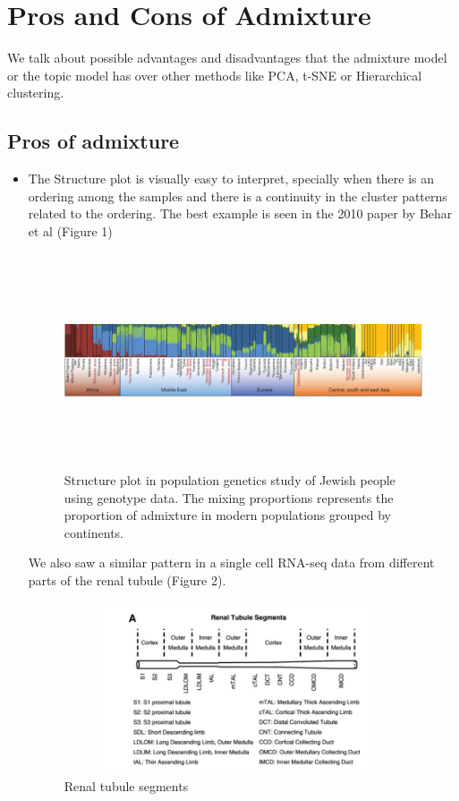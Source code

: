 \documentclass[11pt]{article}
\begin{document}
\section{Pros and Cons of Admixture}

We talk about possible advantages and disadvantages that the admixture model or the topic model has over other methods like PCA, t-SNE or Hierarchical clustering. 

\subsection{Pros of admixture}

\begin{itemize}

\item The Structure plot is visually easy to interpret, specially when there is an ordering among the samples and there is a continuity in the cluster patterns related to the ordering. The best example is seen in the 2010 paper by Behar et al  (Figure 1)

\begin{figure}[ht]
	\centering
	\includegraphics[height=2.5in, width=5in]{structure_continuity.png}
        \caption{Structure plot in population genetics study of Jewish people using genotype data. The mixing proportions represents the proportion of admixture in modern populations grouped by continents.}
\end{figure}

We also saw a similar pattern in a single cell RNA-seq data from different parts of the renal tubule (Figure 2).

\begin{figure}[ht]
	\centering
	\includegraphics[height=2in, width=4in]{renal_tubule.png}
        \caption{Renal tubule segments}
\end{figure}


\end{itemize}
\end{document}

